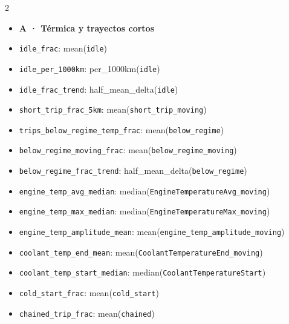 \begin{multicols}{2}
\raggedright
\begin{itemize}[leftmargin=0pt,itemsep=0pt,label={}]
\item[] \textbf{A · Térmica y trayectos cortos}
\item[] \texttt{idle\_\allowbreak{}frac}: mean(\texttt{idle})
\item[] \texttt{idle\_\allowbreak{}per\_\allowbreak{}1000km}: per\_\allowbreak{}1000km(\texttt{idle})
\item[] \texttt{idle\_\allowbreak{}frac\_\allowbreak{}trend}: half\_\allowbreak{}mean\_\allowbreak{}delta(\texttt{idle})
\item[] \texttt{short\_\allowbreak{}trip\_\allowbreak{}frac\_\allowbreak{}5km}: mean(\texttt{short\_\allowbreak{}trip\_\allowbreak{}moving})
\item[] \texttt{trips\_\allowbreak{}below\_\allowbreak{}regime\_\allowbreak{}temp\_\allowbreak{}frac}: mean(\texttt{below\_\allowbreak{}regime})
\item[] \texttt{below\_\allowbreak{}regime\_\allowbreak{}moving\_\allowbreak{}frac}: mean(\texttt{below\_\allowbreak{}regime\_\allowbreak{}moving})
\item[] \texttt{below\_\allowbreak{}regime\_\allowbreak{}frac\_\allowbreak{}trend}: half\_\allowbreak{}mean\_\allowbreak{}delta(\texttt{below\_\allowbreak{}regime})
\item[] \texttt{engine\_\allowbreak{}temp\_\allowbreak{}avg\_\allowbreak{}median}: median(\texttt{EngineTemperatureAvg\_\allowbreak{}moving})
\item[] \texttt{engine\_\allowbreak{}temp\_\allowbreak{}max\_\allowbreak{}median}: median(\texttt{EngineTemperatureMax\_\allowbreak{}moving})
\item[] \texttt{engine\_\allowbreak{}temp\_\allowbreak{}amplitude\_\allowbreak{}mean}: mean(\texttt{engine\_\allowbreak{}temp\_\allowbreak{}amplitude\_\allowbreak{}moving})
\item[] \texttt{coolant\_\allowbreak{}temp\_\allowbreak{}end\_\allowbreak{}mean}: mean(\texttt{CoolantTemperatureEnd\_\allowbreak{}moving})
\item[] \texttt{coolant\_\allowbreak{}temp\_\allowbreak{}start\_\allowbreak{}median}: median(\texttt{CoolantTemperatureStart})
\item[] \texttt{cold\_\allowbreak{}start\_\allowbreak{}frac}: mean(\texttt{cold\_\allowbreak{}start})
\item[] \texttt{chained\_\allowbreak{}trip\_\allowbreak{}frac}: mean(\texttt{chained})

\end{itemize}
\end{multicols}

